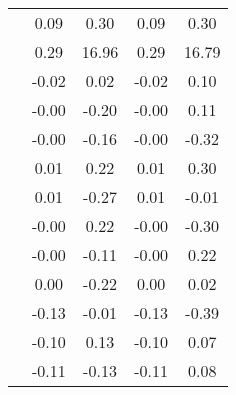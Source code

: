 \begin{table}
\begin{tabular}{c|cc|cc|}
\multicolumn{1}{|c|}{} & \multicolumn{1}{|c|}{      0.09} & \multicolumn{1}{|c|}{      0.30} & \multicolumn{1}{|c|}{      0.09} & \multicolumn{1}{|c|}{      0.30} \\ 
\multicolumn{1}{|c|}{} & \multicolumn{1}{|c|}{      0.29} & \multicolumn{1}{|c|}{     16.96} & \multicolumn{1}{|c|}{      0.29} & \multicolumn{1}{|c|}{     16.79} \\ 
\multicolumn{1}{|c|}{} & \multicolumn{1}{|c|}{     -0.02} & \multicolumn{1}{|c|}{      0.02} & \multicolumn{1}{|c|}{     -0.02} & \multicolumn{1}{|c|}{      0.10} \\ 
\multicolumn{1}{|c|}{} & \multicolumn{1}{|c|}{     -0.00} & \multicolumn{1}{|c|}{     -0.20} & \multicolumn{1}{|c|}{     -0.00} & \multicolumn{1}{|c|}{      0.11} \\ 
\multicolumn{1}{|c|}{} & \multicolumn{1}{|c|}{     -0.00} & \multicolumn{1}{|c|}{     -0.16} & \multicolumn{1}{|c|}{     -0.00} & \multicolumn{1}{|c|}{     -0.32} \\ 
\multicolumn{1}{|c|}{} & \multicolumn{1}{|c|}{      0.01} & \multicolumn{1}{|c|}{      0.22} & \multicolumn{1}{|c|}{      0.01} & \multicolumn{1}{|c|}{      0.30} \\ 
\multicolumn{1}{|c|}{} & \multicolumn{1}{|c|}{      0.01} & \multicolumn{1}{|c|}{     -0.27} & \multicolumn{1}{|c|}{      0.01} & \multicolumn{1}{|c|}{     -0.01} \\ 
\multicolumn{1}{|c|}{} & \multicolumn{1}{|c|}{     -0.00} & \multicolumn{1}{|c|}{      0.22} & \multicolumn{1}{|c|}{     -0.00} & \multicolumn{1}{|c|}{     -0.30} \\ 
\multicolumn{1}{|c|}{} & \multicolumn{1}{|c|}{     -0.00} & \multicolumn{1}{|c|}{     -0.11} & \multicolumn{1}{|c|}{     -0.00} & \multicolumn{1}{|c|}{      0.22} \\ 
\multicolumn{1}{|c|}{} & \multicolumn{1}{|c|}{      0.00} & \multicolumn{1}{|c|}{     -0.22} & \multicolumn{1}{|c|}{      0.00} & \multicolumn{1}{|c|}{      0.02} \\ 
\multicolumn{1}{|c|}{} & \multicolumn{1}{|c|}{     -0.13} & \multicolumn{1}{|c|}{     -0.01} & \multicolumn{1}{|c|}{     -0.13} & \multicolumn{1}{|c|}{     -0.39} \\ 
\multicolumn{1}{|c|}{} & \multicolumn{1}{|c|}{     -0.10} & \multicolumn{1}{|c|}{      0.13} & \multicolumn{1}{|c|}{     -0.10} & \multicolumn{1}{|c|}{      0.07} \\ 
\multicolumn{1}{|c|}{} & \multicolumn{1}{|c|}{     -0.11} & \multicolumn{1}{|c|}{     -0.13} & \multicolumn{1}{|c|}{     -0.11} & \multicolumn{1}{|c|}{      0.08} \\ 

\end{tabular}
\end{table}
